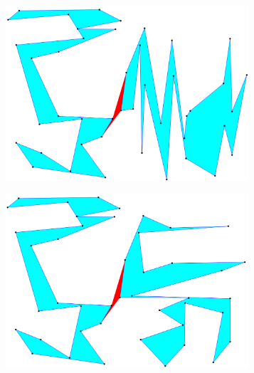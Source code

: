 \documentclass[conference]{IEEEtran}
\begin{document}
\begin{figure}[htbp]
			\begin{subfigure}{0.45\linewidth}
				\centering
				\includegraphics[width=0.99\textwidth]{fig1c.png}
				\caption{}
				\label{fig1c}
			\end{subfigure}
			\begin{subfigure}{0.45\linewidth}
				\centering
				\includegraphics[width=0.99\textwidth]{fig1d.png}
				\caption{}
				\label{fig1d}
			\end{subfigure}
			

\end{figure}
\end{document}
